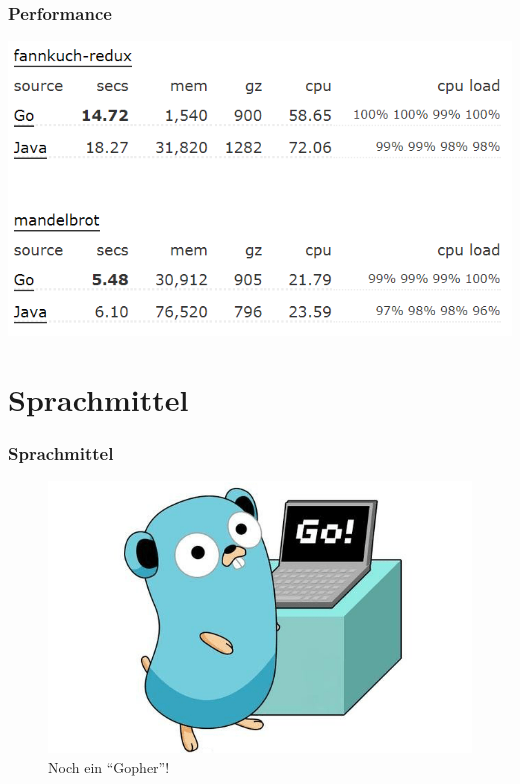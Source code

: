 \documentclass{beamer}
\begin{document}
\begin{frame}
\frametitle{Performance}

\centering
\includegraphics[scale=0.6]{performance2.png}

\end{frame}


\section{Sprachmittel}
\begin{frame}
\frametitle{Sprachmittel}

\centering
\begin{figure}
\includegraphics[scale=0.45]{sprachmittel.png}
\caption{Noch ein ``Gopher''!}
\end{figure}

\end{frame}

\end{document}
